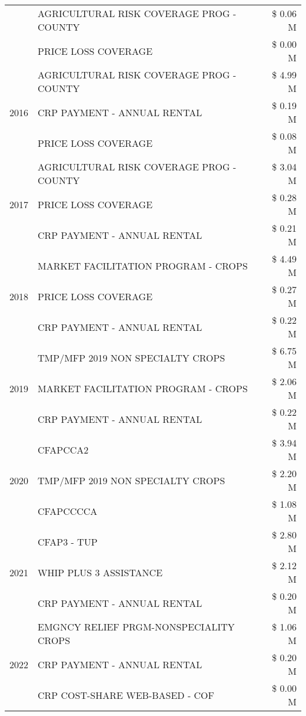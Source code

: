 \begin{tabular}{llr}
 & AGRICULTURAL RISK COVERAGE PROG - COUNTY & \$ 0.06 M \\
 & PRICE LOSS COVERAGE & \$ 0.00 M \\
\cline{1-3}
\multirow[t]{3}{*}{2016} & AGRICULTURAL RISK COVERAGE PROG - COUNTY & \$ 4.99 M \\
 & CRP PAYMENT - ANNUAL RENTAL & \$ 0.19 M \\
 & PRICE LOSS COVERAGE & \$ 0.08 M \\
\cline{1-3}
\multirow[t]{3}{*}{2017} & AGRICULTURAL RISK COVERAGE PROG - COUNTY & \$ 3.04 M \\
 & PRICE LOSS COVERAGE & \$ 0.28 M \\
 & CRP PAYMENT - ANNUAL RENTAL & \$ 0.21 M \\
\cline{1-3}
\multirow[t]{3}{*}{2018} & MARKET FACILITATION PROGRAM - CROPS & \$ 4.49 M \\
 & PRICE LOSS COVERAGE & \$ 0.27 M \\
 & CRP PAYMENT - ANNUAL RENTAL & \$ 0.22 M \\
\cline{1-3}
\multirow[t]{3}{*}{2019} & TMP/MFP 2019 NON SPECIALTY CROPS & \$ 6.75 M \\
 & MARKET FACILITATION PROGRAM - CROPS & \$ 2.06 M \\
 & CRP PAYMENT - ANNUAL RENTAL & \$ 0.22 M \\
\cline{1-3}
\multirow[t]{3}{*}{2020} & CFAPCCA2 & \$ 3.94 M \\
 & TMP/MFP 2019 NON SPECIALTY CROPS & \$ 2.20 M \\
 & CFAPCCCCA & \$ 1.08 M \\
\cline{1-3}
\multirow[t]{3}{*}{2021} & CFAP3 - TUP & \$ 2.80 M \\
 & WHIP PLUS 3 ASSISTANCE & \$ 2.12 M \\
 & CRP PAYMENT - ANNUAL RENTAL & \$ 0.20 M \\
\cline{1-3}
\multirow[t]{3}{*}{2022} & EMGNCY RELIEF PRGM-NONSPECIALITY CROPS & \$ 1.06 M \\
 & CRP PAYMENT - ANNUAL RENTAL & \$ 0.20 M \\
 & CRP COST-SHARE WEB-BASED - COF & \$ 0.00 M \\
\cline{1-3}
\bottomrule
\end{tabular}
